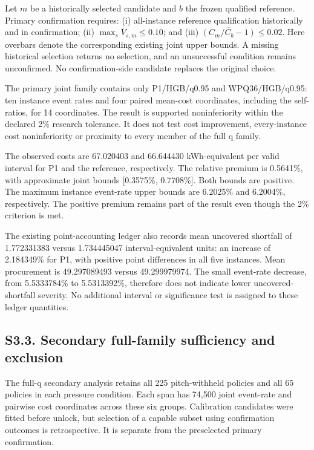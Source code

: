 \documentclass[
  british,
  11pt,
]{article}
\begin{document}
Let \(m\) be a historically selected candidate and \(b\) the frozen
qualified reference. Primary confirmation requires: (i) all-instance
reference qualification historically and in confirmation; (ii)
\(\max_s\overline V_{s,m}\le0.10\); and (iii)
\(\overline{(C_m/C_b-1)}\le0.02\). Here overbars denote the
corresponding existing joint upper bounds. A missing historical
selection returns no selection, and an unsuccessful condition remains
unconfirmed. No confirmation-side candidate replaces the original
choice.

The primary joint family contains only P1/HGB/q0.95 and WPQ36/HGB/q0.95:
ten instance event rates and four paired mean-cost coordinates,
including the self-ratios, for 14 coordinates. The result is supported
noninferiority within the declared 2\% research tolerance. It does not
test cost improvement, every-instance cost noninferiority or proximity
to every member of the full q family.

The observed costs are 67.020403 and 66.644430 kWh-equivalent per valid
interval for P1 and the reference, respectively. The relative premium is
0.5641\%, with approximate joint bounds {[}0.3575\%, 0.7708\%{]}. Both
bounds are positive. The maximum instance event-rate upper bounds are
6.2025\% and 6.2004\%, respectively. The positive premium remains part
of the result even though the 2\% criterion is met.

The existing point-accounting ledger also records mean uncovered
shortfall of 1.772331383 versus 1.734445047 interval-equivalent units:
an increase of 2.184349\% for P1, with positive point differences in all
five instances. Mean procurement is 49.297089493 versus 49.299979974.
The small event-rate decrease, from 5.5333784\% to 5.5313392\%,
therefore does not indicate lower uncovered-shortfall severity. No
additional interval or significance test is assigned to these ledger
quantities.

\subsection{S3.3. Secondary full-family sufficiency and
exclusion}\label{s3.3.-secondary-full-family-sufficiency-and-exclusion}

The full-q secondary analysis retains all 225 pitch-withheld policies
and all 65 policies in each pressure condition. Each span has 74,500
joint event-rate and pairwise cost coordinates across these six groups.
Calibration candidates were fitted before unlock, but selection of a
capable subset using confirmation outcomes is retrospective. It is
separate from the preselected primary confirmation.
\end{document}
